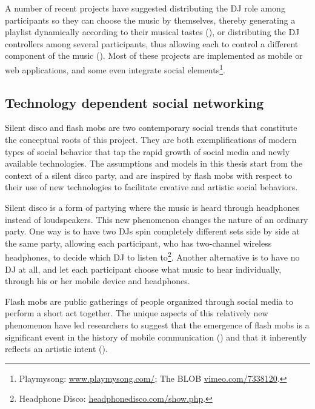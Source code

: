 \documentclass[a4paper,11pt]{article}
\begin{document}
A number of recent projects have suggested distributing the DJ role among participants so they can choose the music by themselves, thereby generating a playlist dynamically according to their musical tastes (\cite{web:shaw}), or distributing the DJ controllers among several participants, thus allowing each to control a different component of the music (\cite{web:shapira}).
Most of these projects are implemented as mobile or web applications, and some even integrate social elements\footnote{Playmysong: \href{http://www.playmysong.com/}{www.playmysong.com/}; The BLOB \href{http://vimeo.com/7338120}{vimeo.com/7338120}.}.

\subsection{Technology dependent social networking} \label{literature:social_tech}

Silent disco and flash mobs are two contemporary social trends that constitute the conceptual roots of this project.
They are both exemplifications of modern types of social behavior that tap the rapid growth of social media and newly available technologies.
The assumptions and models in this thesis start from the context of a silent disco party, and are inspired by flash mobs with respect to their use of new technologies to facilitate creative and artistic social behaviors.

Silent disco is a form of partying where the music is heard through headphones instead of loudspeakers.
This new phenomenon changes the nature of an ordinary party.
One way is to have two DJs spin completely different sets side by side at the same party, allowing each participant, who has two-channel wireless headphones, to decide which DJ to listen to\footnote{Headphone Disco: \href{http://headphonedisco.com/show.php}{headphonedisco.com/show.php}.}.
Another alternative is to have no DJ at all, and let each participant choose what music to hear individually, through his or her mobile device and headphones.

Flash mobs are public gatherings of people organized through social media to perform a short act together.
The unique aspects of this relatively new phenomenon have led researchers to suggest that the emergence of flash mobs is a significant event in the history of mobile communication (\cite{nicholson05}) and that it inherently reflects an artistic intent (\cite{brejzek10}).
\end{document}
